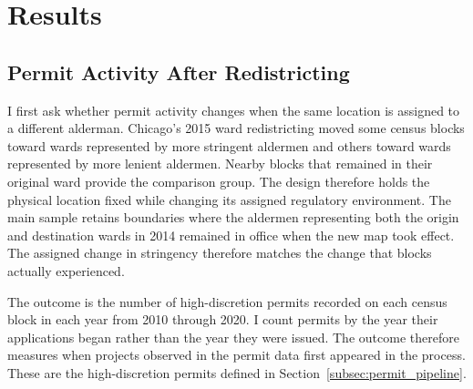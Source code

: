 
\section{Results}
\label{sec:empirical_results}

\subsection{Permit Activity After Redistricting}
\label{sec:empirical_results_permits}

I first ask whether permit activity changes when the same location is assigned to a different alderman.
Chicago's 2015 ward redistricting moved some census blocks toward wards represented by more stringent aldermen and others toward wards represented by more lenient aldermen.
Nearby blocks that remained in their original ward provide the comparison group.
The design therefore holds the physical location fixed while changing its assigned regulatory environment.
The main sample retains boundaries where the aldermen representing both the origin and destination wards in 2014 remained in office when the new map took effect.
The assigned change in stringency therefore matches the change that blocks actually experienced.

The outcome is the number of high-discretion permits recorded on each census block in each year from 2010 through 2020.
I count permits by the year their applications began rather than the year they were issued.
The outcome therefore measures when projects observed in the permit data first appeared in the process.
These are the high-discretion permits defined in Section~\ref{subsec:permit_pipeline}.

